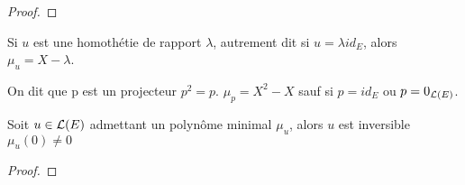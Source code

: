 \begin{proof}
\end{proof}

\begin{example}
	Si $u$ est une homothétie de rapport $\lambda$, autrement dit si $u = \lambda id_E$, alors $\mu_u = X - \lambda$.
\end{example}

\begin{remarque}
	On dit que p est un projecteur \ssi ${p}^2 = p$.
	$\mu_p = X^2 - X$ sauf si $p = id_E$ ou $p = 0_{\mathcal{L}(E)}$.
\end{remarque}

\begin{prop}
	Soit $u \in \mathcal{L}(E)$ admettant un polynôme minimal $\mu_u$, alors $u$ est inversible \ssi $\mu_u(0) \neq 0$
\end{prop}

\begin{proof}
\end{proof}
